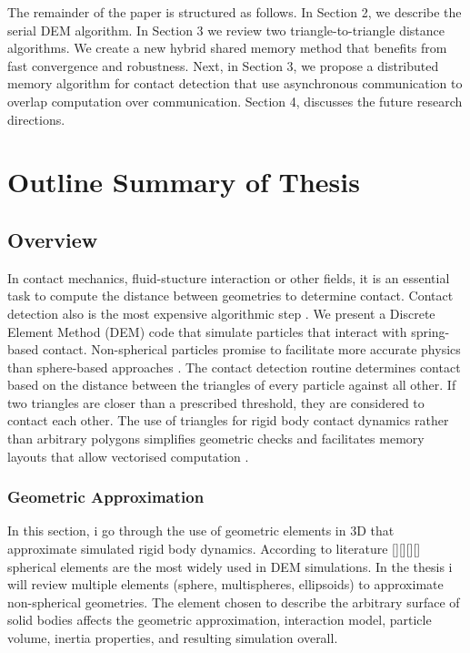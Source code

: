\documentclass[times,12pt]{article}
\begin{document}
The remainder of the paper is structured as follows. In Section 2, we describe the serial DEM  algorithm. In Section 3 we review two triangle-to-triangle distance algorithms. We create a new hybrid shared memory method that benefits from fast convergence and robustness. Next, in Section 3, we propose a distributed memory algorithm for contact detection that use asynchronous communication to overlap computation over communication. Section 4, discusses the future research directions.

\section{Outline Summary of Thesis}

\subsection{Overview}

In contact mechanics, fluid-stucture interaction or other fields, it is an essential task to compute the distance between geometries to determine contact. Contact detection also is the most expensive algorithmic step \cite{Koziara2010, Wachs2012}. We present a Discrete Element Method (DEM) code that simulate particles that interact with spring-based contact. Non-spherical particles promise to facilitate more accurate physics than sphere-based approaches \cite{AlonsoMarroqu2013, Girolami2012}. The contact detection routine determines contact based on the distance between the triangles of every particle against all other. If two triangles are closer than a prescribed threshold, they are considered to contact each other. The use of triangles for rigid body contact dynamics rather than arbitrary polygons simplifies geometric checks and facilitates memory layouts that allow vectorised computation \cite{Eichenberger2004, Juurlink, Krestenitis2015, Krestenitis2016}.

\subsubsection{Geometric Approximation}

In this section, i go through the use of geometric elements in 3D that approximate simulated rigid body dynamics. According to literature [][][][] spherical elements are the most widely used in DEM simulations. In the thesis i will review multiple elements (sphere, multispheres, ellipsoids) to approximate non-spherical geometries. The element chosen to describe the arbitrary surface of solid bodies affects the geometric approximation, interaction model, particle volume, inertia properties, and resulting simulation overall.
\end{document}
